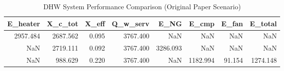 \begin{table}
\caption{DHW System Performance Comparison (Original Paper Scenario)}
\label{tab:paper_results}
\begin{tabular}{rrrrrrrr}
\toprule
E_heater & X_c_tot & X_eff & Q_w_serv & E_NG & E_cmp & E_fan & E_total \\
\midrule
2957.484 & 2687.562 & 0.095 & 3767.400 & NaN & NaN & NaN & NaN \\
NaN & 2719.111 & 0.092 & 3767.400 & 3286.093 & NaN & NaN & NaN \\
NaN & 988.629 & 0.220 & 3767.400 & NaN & 1182.994 & 91.154 & 1274.148 \\
\bottomrule
\end{tabular}
\end{table}
